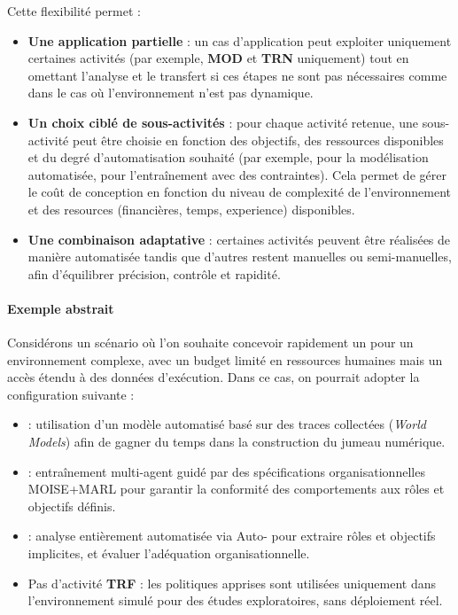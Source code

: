 Cette flexibilité permet :
\begin{itemize}
  \item \textbf{Une application partielle} : un cas d'application peut exploiter uniquement certaines activités (par exemple, \textbf{MOD} et \textbf{TRN} uniquement) tout en omettant l'analyse et le transfert si ces étapes ne sont pas nécessaires comme dans le cas où l'environnement n'est pas dynamique.
  \item \textbf{Un choix ciblé de sous-activités} : pour chaque activité retenue, une sous-activité peut être choisie en fonction des objectifs, des ressources disponibles et du degré d'automatisation souhaité (par exemple,  pour la modélisation automatisée,  pour l'entraînement avec des contraintes). Cela permet de gérer le coût de conception en fonction du niveau de complexité de l'environnement et des resources (financières, temps, experience) disponibles.
  \item \textbf{Une combinaison adaptative} : certaines activités peuvent être réalisées de manière automatisée tandis que d'autres restent manuelles ou semi-manuelles, afin d'équilibrer précision, contrôle et rapidité.
\end{itemize}

\paragraph{Exemple abstrait}
Considérons un scénario où l'on souhaite concevoir rapidement un  pour un environnement complexe, avec un budget limité en ressources humaines mais un accès étendu à des données d'exécution.
Dans ce cas, on pourrait adopter la configuration suivante :
\begin{itemize}
  \item {} : utilisation d'un modèle automatisé basé sur des traces collectées (\textit{World Models}) afin de gagner du temps dans la construction du jumeau numérique.
  \item {} : entraînement multi-agent guidé par des spécifications organisationnelles MOISE+MARL pour garantir la conformité des comportements aux rôles et objectifs définis.
  \item {} : analyse entièrement automatisée via Auto- pour extraire rôles et objectifs implicites, et évaluer l'adéquation organisationnelle.
  \item Pas d'activité \textbf{TRF} : les politiques apprises sont utilisées uniquement dans l'environnement simulé pour des études exploratoires, sans déploiement réel.
\end{itemize}

